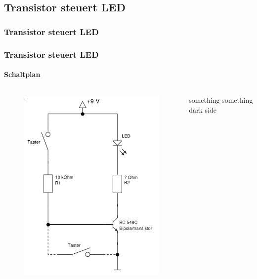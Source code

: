 \subsection{Transistor steuert LED} %
\label{sub:Transistor_steuert_LED}
\begin{frame}
    \frametitle{Transistor steuert LED}
    \framesubtitle{}
    
\end{frame}
\begin{frame}
    \frametitle{Transistor steuert LED}
    \framesubtitle{Schaltplan}
    \begin{columns}[c]
        \begin{figure}[H]
        \begin{center}
                \includegraphics[scale=0.35]{./img/schaltungen/transistorLED_1.png}
        \end{center}
        \end{figure}
        something something dark side 
    \end{columns}
\end{frame}
